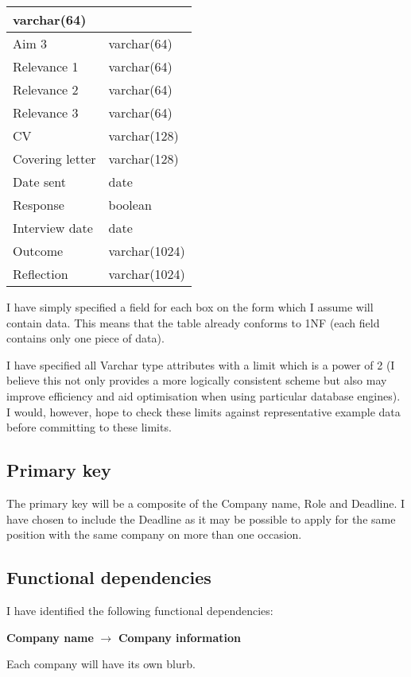 \documentclass[a4paper, twoside]{article}
\begin{document}
\begin{center}
\begin{tabular}{|l|l|}
varchar(64) \\ \hline Aim 3 & varchar(64) \\ \hline Relevance 1 & varchar(64) \\
\hline Relevance 2 & varchar(64) \\ \hline Relevance 3 & varchar(64) \\ \hline
CV & varchar(128) \\ \hline Covering letter & varchar(128) \\ \hline Date sent &
date \\ \hline Response & boolean \\ \hline Interview date & date \\ \hline
Outcome & varchar(1024) \\ \hline Reflection & varchar(1024) \\ \hline
\end{tabular} \end{center}

I have simply specified a field for each box on the form which I assume will
contain data. This means that the table already conforms to 1NF (each field
contains only one piece of data).

I have specified all Varchar type attributes with a limit which is a power of 2
(I believe this not only provides a more logically consistent scheme but also
may improve efficiency and aid optimisation when using particular database
engines). I would, however, hope to check these limits against representative
example data before committing to these limits.

\subsection{Primary key}
The primary key will be a composite of the Company name, Role and Deadline. I
have chosen to include the Deadline as it may be possible to apply for the same
position with the same company on more than one occasion.

\newpage
\subsection{Functional dependencies}
I have identified the following functional dependencies:

\begin{center}
  \textbf{Company name} $\rightarrow$ \textbf{Company information}
\end{center}
Each company will have its own blurb.
\end{document}

